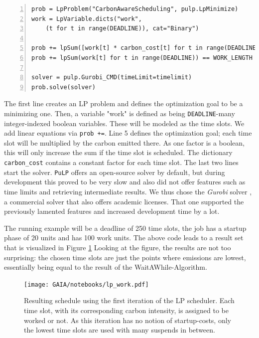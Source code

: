 \begin{minipage}{\linewidth}
\begin{lstlisting}[frame=single, numbers=left, caption={LP Implementation for basic scheduling}, label={list:lp_work}, basicstyle=\ttfamily, breaklines]
prob = LpProblem("CarbonAwareScheduling", pulp.LpMinimize)
work = LpVariable.dicts("work", 
    (t for t in range(DEADLINE)), cat="Binary")

prob += lpSum([work[t] * carbon_cost[t] for t in range(DEADLINE)]) 
prob += lpSum(work[t] for t in range(DEADLINE)) == WORK_LENGTH 

solver = pulp.Gurobi_CMD(timeLimit=timelimit)
prob.solve(solver)
\end{lstlisting}
\end{minipage}

The first line creates an LP problem and defines the optimization goal to be a minimizing one. 
Then, a variable "work" is defined as being \verb|DEADLINE|-many integer-indexed boolean variables. 
These will be modeled as the time slots. 
We add linear equations via \verb|prob +=|.
Line 5 defines the optimization goal; each time slot will be multiplied by the carbon emitted there. As one factor is a boolean, this will only increase the sum if the time slot is scheduled. The dictionary \verb|carbon_cost| contains a constant factor for each time slot.
The last two lines start the solver. 
\verb|PuLP| offers an open-source solver by default, but during development this proved to be very slow and also did not offer features such as time limits and retrieving intermediate results.
We thus chose the \emph{Gurobi} solver , a commercial solver that also offers academic licenses.
That one supported the previously lamented features and increased development time by a lot. 

The running example will be a deadline of 250 time slots, the job has a startup phase of 20 units and has 100 work units. 
The above code leads to a result set that is visualized in Figure \ref{fig:lp_work}
Looking at the figure, the results are not too surprising: the chosen time slots are just the points where emissions are lowest, essentially being equal to the result of the WaitAWhile-Algorithm.

\begin{figure}[H]
    \texttt{[image: GAIA/notebooks/lp\_work.pdf]}
    \caption{Resulting schedule using the first iteration of the LP scheduler. Each time slot, with its corresponding carbon intensity, is assigned to be worked or not. As this iteration has no notion of startup-costs, only the lowest time slots are used with many suspends in between.}
    \label{fig:lp_work}
\end{figure}    

